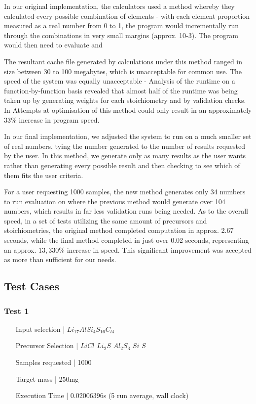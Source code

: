 In our original implementation, the calculators used a method whereby they calculated every possible combination of elements - with each element proportion measured as a real number from 0 to 1, the program would incrementally run through the combinations in very small margins (approx. 10-3). The program would then need to evaluate and 

The resultant cache file generated by calculations under this method ranged in size between 30 to 100 megabytes, which is unacceptable for common use. The speed of the system was equally unacceptable - Analysis of the runtime on a function-by-function basis revealed that almost half of the runtime was being taken up by generating weights for each stoichiometry and by validation checks. In  Attempts at optimisation of this method could only result in an approximately 33\% increase in program speed.

In our final implementation, we adjusted the system to run on a much smaller set of real numbers, tying the number generated to the number of results requested by the user. In this method, we generate only as many results as the user wants rather than generating every possible result and then checking to see which of them fits the user criteria.

For a user requesting 1000 samples, the new method generates only 34 numbers to run evaluation on where the previous method would generate over 104 numbers, which results in far less validation runs being needed. As to the overall speed, in a set of tests utilizing the same amount of precursors and stoichiometries, the original method completed computation in approx. 2.67 seconds, while the final method completed in just over 0.02 seconds, representing an approx. $13,330\%$ increase in speed. This significant improvement was accepted as more than sufficient for our needs.

\subsection{Test Cases}
\subsubsection{Test 1}
\begin{enumerate}[label = {}, leftmargin=\widthof{Precursor Selection |}+\labelsep]
    \item[Input selection |] $Li_{17}AlSi_{4}S_{16}C_{l4}$
    \item[Precursor Selection |] $LiCl$ $Li_2S$ $Al_2S_3$ $Si$ $S$
    \item[Samples requested |] 1000
    \item[Target mass |] 250mg
    \item[Execution Time |] 0.02006396s (5 run average, wall clock)
\end{enumerate}

